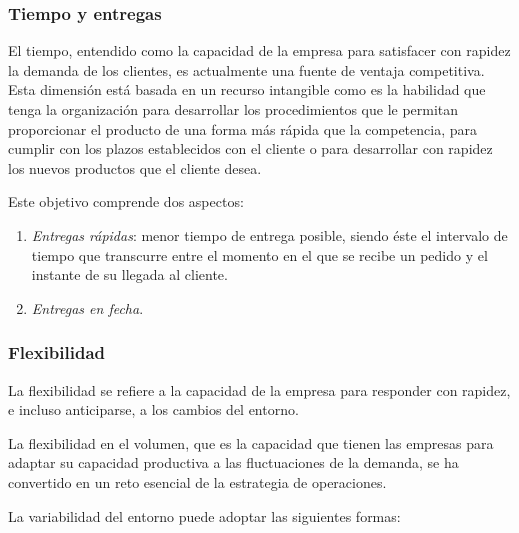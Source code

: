 \documentclass[10pt,a4paper,spanish]{report}
\begin{document}
                  \subsubsection{\textcolor[rgb]{0.9,0.7,0.6}Tiempo y entregas}

                        El tiempo, entendido como la capacidad de la empresa para satisfacer con rapidez la demanda de los clientes, es actualmente una fuente de ventaja competitiva. Esta dimensión está basada en un recurso intangible como es la habilidad que tenga la organización para desarrollar los procedimientos que le permitan proporcionar el producto de una forma más rápida que la competencia, para cumplir con los plazos establecidos con el cliente o para desarrollar con rapidez los nuevos productos que el cliente desea.

                        Este objetivo comprende dos aspectos:

                        \begin{enumerate}[---]
                              \item \textit{\textcolor[rgb]{0.9,0.7,0.6}{Entregas rápidas}}: menor tiempo de entrega posible, siendo éste el intervalo de tiempo que transcurre entre el momento en el que se recibe un pedido y el instante de su llegada al cliente.
                              \item \textit{\textcolor[rgb]{0.9,0.7,0.6}{Entregas en fecha}}.
                        \end{enumerate}

                  \subsubsection{\textcolor[rgb]{0.9,0.7,0.6}Flexibilidad}

                        La flexibilidad se refiere a la capacidad de la empresa para responder con rapidez, e incluso anticiparse, a los cambios del entorno.

                        La flexibilidad en el volumen, que es la capacidad que tienen las empresas para adaptar su capacidad productiva a las fluctuaciones de la demanda, se ha convertido en un reto esencial de la estrategia de operaciones.

                        La variabilidad del entorno puede adoptar las siguientes formas:
\end{document}
